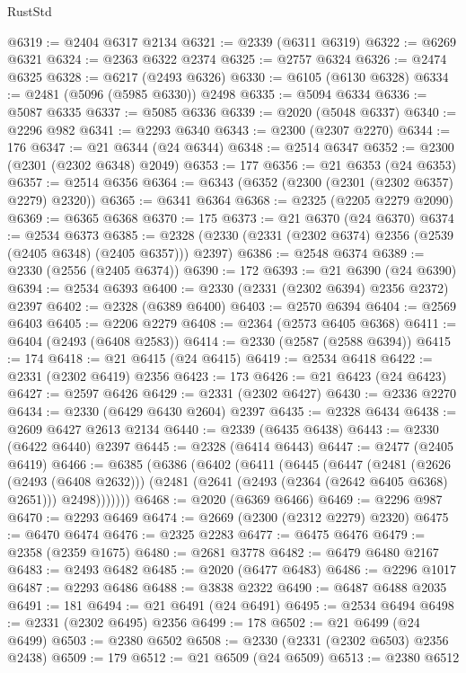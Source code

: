 \begin{lexlean}{RustStd}
\begin{coremodule}
@6319 := @2404 @6317 @2134
@6321 := @2339 (@6311 @6319)
@6322 := @6269 @6321
@6324 := @2363 @6322 @2374
@6325 := @2757 @6324
@6326 := @2474 @6325
@6328 := @6217 (@2493 @6326)
@6330 := @6105 (@6130 @6328)
@6334 := @2481 (@5096 (@5985 @6330)) @2498
@6335 := @5094 @6334
@6336 := @5087 @6335
@6337 := @5085 @6336
@6339 := @2020 (@5048 @6337)
@6340 := @2296 @982
@6341 := @2293 @6340
@6343 := @2300 (@2307 @2270)
@6344 := 176
@6347 := @21 @6344 (@24 @6344)
@6348 := @2514 @6347
@6352 := @2300 (@2301 (@2302 @6348) @2049)
@6353 := 177
@6356 := @21 @6353 (@24 @6353)
@6357 := @2514 @6356
@6364 := @6343 (@6352 (@2300 (@2301 (@2302 @6357) @2279) @2320))
@6365 := @6341 @6364
@6368 := @2325 (@2205 @2279 @2090)
@6369 := @6365 @6368
@6370 := 175
@6373 := @21 @6370 (@24 @6370)
@6374 := @2534 @6373
@6385 := @2328 (@2330 (@2331 (@2302 @6374) @2356 (@2539 (@2405 @6348) (@2405 @6357))) @2397)
@6386 := @2548 @6374
@6389 := @2330 (@2556 (@2405 @6374))
@6390 := 172
@6393 := @21 @6390 (@24 @6390)
@6394 := @2534 @6393
@6400 := @2330 (@2331 (@2302 @6394) @2356 @2372) @2397
@6402 := @2328 (@6389 @6400)
@6403 := @2570 @6394
@6404 := @2569 @6403
@6405 := @2206 @2279
@6408 := @2364 (@2573 @6405 @6368)
@6411 := @6404 (@2493 (@6408 @2583))
@6414 := @2330 (@2587 (@2588 @6394))
@6415 := 174
@6418 := @21 @6415 (@24 @6415)
@6419 := @2534 @6418
@6422 := @2331 (@2302 @6419) @2356
@6423 := 173
@6426 := @21 @6423 (@24 @6423)
@6427 := @2597 @6426
@6429 := @2331 (@2302 @6427)
@6430 := @2336 @2270
@6434 := @2330 (@6429 @6430 @2604) @2397
@6435 := @2328 @6434
@6438 := @2609 @6427 @2613 @2134
@6440 := @2339 (@6435 @6438)
@6443 := @2330 (@6422 @6440) @2397
@6445 := @2328 (@6414 @6443)
@6447 := @2477 (@2405 @6419)
@6466 := @6385
    (@6386
      (@6402
        (@6411
          (@6445
            (@6447
              (@2481
                (@2626 (@2493 (@6408 @2632)))
                (@2481 (@2641 (@2493 (@2364 (@2642 @6405 @6368) @2651))) @2498)))))))
@6468 := @2020 (@6369 @6466)
@6469 := @2296 @987
@6470 := @2293 @6469
@6474 := @2669 (@2300 (@2312 @2279) @2320)
@6475 := @6470 @6474
@6476 := @2325 @2283
@6477 := @6475 @6476
@6479 := @2358 (@2359 @1675)
@6480 := @2681 @3778
@6482 := @6479 @6480 @2167
@6483 := @2493 @6482
@6485 := @2020 (@6477 @6483)
@6486 := @2296 @1017
@6487 := @2293 @6486
@6488 := @3838 @2322
@6490 := @6487 @6488 @2035
@6491 := 181
@6494 := @21 @6491 (@24 @6491)
@6495 := @2534 @6494
@6498 := @2331 (@2302 @6495) @2356
@6499 := 178
@6502 := @21 @6499 (@24 @6499)
@6503 := @2380 @6502
@6508 := @2330 (@2331 (@2302 @6503) @2356 @2438)
@6509 := 179
@6512 := @21 @6509 (@24 @6509)
@6513 := @2380 @6512

\end{coremodule}
\end{lexlean}
